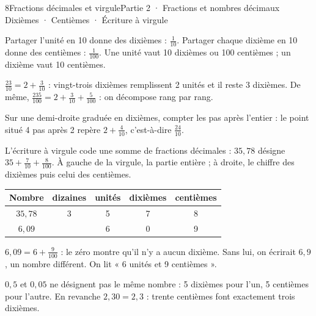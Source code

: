 \begin{ouverture}[calcul]{8}{Fractions décimales et virgule}{Partie 2 · Fractions et nombres décimaux}
{Dixièmes · Centièmes · Écriture à virgule}
\end{ouverture}
\pagestyle{otMain}\essentiel\fontsize{11}{15}\selectfont
{}\label{cours-8-1}
\begin{definition}Partager l’unité en 10 donne des dixièmes : $\frac1{10}$. Partager chaque dixième en 10 donne des centièmes : $\frac1{100}$. Une unité vaut 10 dixièmes ou 100 centièmes ; un dixième vaut 10 centièmes.\end{definition}
\label{fig-cours-8-1-cours-droite-dixiemes}

\begin{exemple}$\frac{23}{10}=2+\frac3{10}$ : vingt-trois dixièmes remplissent 2 unités et il reste 3 dixièmes. De même, $\frac{235}{100}=2+\frac3{10}+\frac5{100}$ : on décompose rang par rang.\end{exemple}
\begin{savoirfaire}Sur une demi-droite graduée en dixièmes, compter les pas après l’entier : le point situé 4 pas après 2 repère $2+\frac4{10}$, c’est-à-dire $\frac{24}{10}$.\end{savoirfaire}
\clearpage
{}\label{cours-8-2}
\begin{definition}L’écriture à virgule code une somme de fractions décimales : $35{,}78$ désigne $35+\frac7{10}+\frac8{100}$. À gauche de la virgule, la partie entière ; à droite, le chiffre des dixièmes puis celui des centièmes.\end{definition}\begin{center}\renewcommand{\arraystretch}{1.35}\begin{tabular}{c|cccc}\toprule
Nombre & dizaines & unités & dixièmes & centièmes\\\midrule
$35{,}78$ & 3 & 5 & 7 & 8\\
$6{,}09$ &  & 6 & 0 & 9\\
\bottomrule\end{tabular}\end{center}
\begin{exemple}$6{,}09=6+\frac9{100}$ : le zéro montre qu’il n’y a aucun dixième. Sans lui, on écrirait $6{,}9$, un nombre différent. On lit « 6 unités et 9 centièmes ».\end{exemple}
\begin{attention}$0{,}5$ et $0{,}05$ ne désignent pas le même nombre : 5 dixièmes pour l’un, 5 centièmes pour l’autre. En revanche $2{,}30=2{,}3$ : trente centièmes font exactement trois dixièmes.\end{attention}


